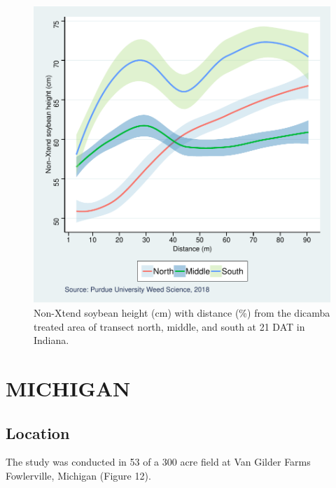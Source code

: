 \documentclass[]{article}
\begin{document}
\begin{figure}
\centering
\includegraphics{Report_Dicamba_study_files/figure-latex/unnamed-chunk-39-1.pdf}
\caption{Non-Xtend soybean height (cm) with distance (\%) from the
dicamba treated area of transect north, middle, and south at 21 DAT in
Indiana.}
\end{figure}

\pagebreak

\section{MICHIGAN}\label{michigan-1}

\subsection{Location}\label{location-2}

The study was conducted in 53 of a 300 acre field at Van Gilder Farms
Fowlerville, Michigan (Figure 12).
\end{document}
